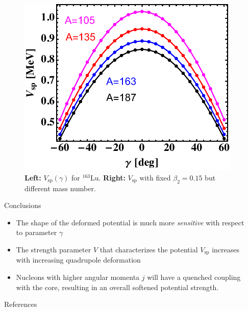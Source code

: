 \documentclass[final]{beamer}
\newlength{\sepwidth}
\newlength{\colwidth}
\newcommand{\separatorcolumn}{\begin{column}{\sepwidth}\end{column}}
\begin{document}
\begin{frame}[t]
\begin{columns}[t]
\begin{column}{\colwidth}
\begin{figure}
\begin{minipage}{.5\textwidth}
 \includegraphics[scale=1]{images/VSp_gammaBehavior-A.pdf}
\end{minipage}
     \caption{\textbf{Left:} $V_\text{sp}(\gamma)$ for $^{163}$Lu. \textbf{Right:} $V_\text{sp}$ with fixed $\beta_2=0.15$ but different mass number.}
     \label{vsp-behavior-gamma}
 \end{figure}
    \begin{block}{Conclusions}
    \begin{itemize}
    \item The shape of the deformed potential is much more \emph{sensitive} with respect to  parameter $\gamma$
    \item The strength parameter $V$ that characterizes the potential $V_\text{sp}$ increases with increasing quadrupole deformation
    \item Nucleons with higher angular momenta $j$ will have a quenched coupling with the core, resulting in an overall softened potential strength.
    \end{itemize}
  \end{block}

  \begin{block}{References}

    \nocite{*}
    \tiny{}

  \end{block}

\end{column}

\separatorcolumn

\end{columns}

\end{frame}
\end{document}

